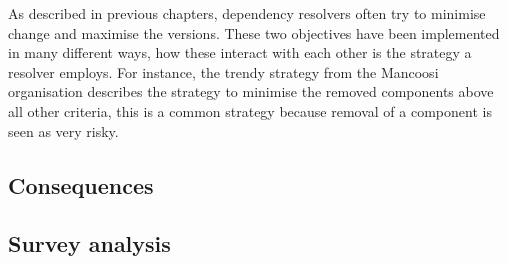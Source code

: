 As described in previous chapters, dependency resolvers often try to minimise change and maximise the versions.
These two objectives have been implemented in many different ways, how these interact with each other is the strategy a resolver employs.
For instance, the trendy strategy from the Mancoosi organisation describes the strategy to minimise the removed components above all other criteria,
this is a common strategy because removal of a component is seen as very risky.

\subsection{Consequences}











\subsection{Survey analysis}


